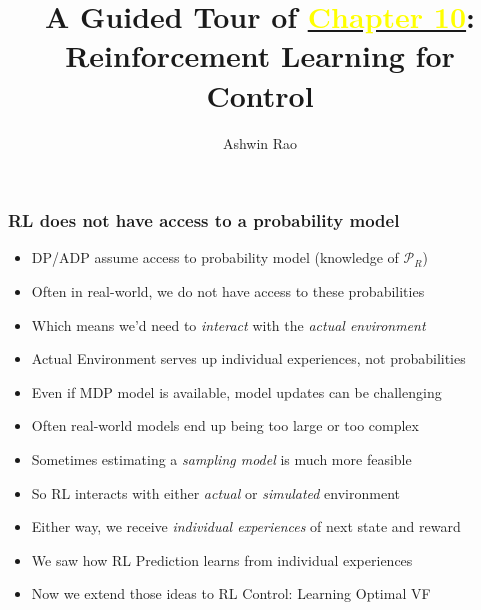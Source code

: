 \documentclass[handout]{beamer}
\title[RL Control Chapter]{A Guided Tour of \href{http://stanford.edu/~ashlearn/RLForFinanceBook/book.pdf}{\underline{\textcolor{yellow}{Chapter 10}}}: \\ Reinforcement Learning for Control} %
\author{Ashwin Rao} %
\institute[Stanford] %
{ICME, Stanford University
}
\date %
\begin{document}
\lstset{language=Python}  
\begin{frame}
\titlepage %
\end{frame}


\begin{frame}
\frametitle{RL does not have access to a probability model}
\begin{itemize}[<+->]
\item DP/ADP assume access to probability model (knowledge of $\mathcal{P}_R$)
\item Often in real-world, we do not have access to these probabilities
\item Which means we'd need to {\em interact} with the {\em actual environment}
\item {Actual Environment} serves up individual experiences, not probabilities
\item Even if MDP model is available, model updates can be challenging
\item Often real-world models end up being too large or too complex
\item Sometimes estimating a {\em sampling model} is much more feasible
\item So RL interacts with either {\em actual} or {\em simulated} environment
\item Either way, we receive {\em individual experiences} of next state and reward
\item We saw how RL Prediction learns from individual experiences
\item Now we extend those ideas to RL Control: Learning Optimal VF
 \end{itemize}
\end{frame}
\end{document}
